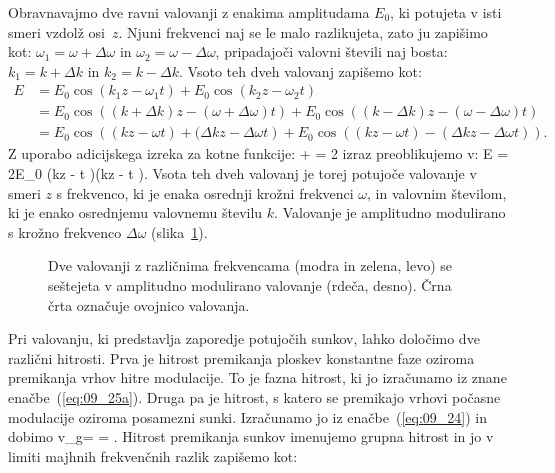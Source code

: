 Obravnavajmo dve ravni valovanji z enakima amplitudama $E_0$, ki potujeta v isti smeri vzdolž
osi~$z$. Njuni frekvenci naj se le malo razlikujeta, zato ju zapišimo kot: 
$\omega_1=\omega + \Delta \omega$ in $\omega_2=\omega - \Delta \omega$, pripadajoči
valovni števili naj bosta: $k_1 = k + \Delta k $ in $k_2 = k - \Delta k$. 
Vsoto teh dveh valovanj zapišemo kot:
\begin{align}
E &= E_0 \cos (k_1z-\omega_1 t)+ E_0 \cos (k_2z-\omega_2 t) \nonumber\\
&= E_0 \cos\left((k+\Delta k)z-(\omega + \Delta \omega)t\right) 
+ E_0 \cos\left((k-\Delta k)z-(\omega - \Delta \omega)t\right)\nonumber \\
&= E_0 \cos\left((kz - \omega t) +(\Delta k z-\Delta \omega t\right)
+ E_0 \cos\left((k z - \omega t) - (\Delta k z- \Delta \omega t)  \right)\!. 
\label{eq:09_23}
\end{align}
Z uporabo adicijskega izreka za kotne funkcije:
\beq
\cos\alpha + \cos \beta = 2 \cos {} \cos {}
\eeq
izraz preoblikujemo v:
\beq
E = 2E_0 \cos \left(kz - \omega t \right)\cos \left(\Delta kz - \Delta \omega t \right)\!.
\label{eq:09_24}
\eeq
Vsota teh dveh valovanj je torej potujoče valovanje v smeri $z$ s frekvenco, ki je 
enaka osrednji krožni frekvenci $\omega$, in valovnim številom, ki je enako 
osrednjemu valovnemu številu $k$. Valovanje je amplitudno modulirano 
s krožno frekvenco $\Delta \omega$ (slika~\ref{fig:09_utripanje}).
\begin{figure}[ht]
\centering
\def\svgwidth{140truemm} 

\caption{Dve valovanji z različnima frekvencama (modra in zelena, levo) se seštejeta
v amplitudno modulirano valovanje (rdeča, desno). Črna črta označuje ovojnico valovanja.}
\label{fig:09_utripanje}
\end{figure}

Pri valovanju, ki predstavlja zaporedje potujočih sunkov, lahko določimo dve
različni hitrosti. Prva je hitrost premikanja ploskev konstantne
faze oziroma premikanja vrhov hitre modulacije. To je fazna hitrost, ki
jo izračunamo iz znane enačbe~(\ref{eq:09_25a}). Druga pa je hitrost, s katero
se premikajo vrhovi počasne modulacije oziroma posamezni sunki. Izračunamo jo
iz enačbe~(\ref{eq:09_24}) in dobimo 
\beq
v_g= = .
\eeq
Hitrost premikanja sunkov imenujemo grupna hitrost in jo 
v limiti majhnih frekvenčnih razlik zapišemo kot:

